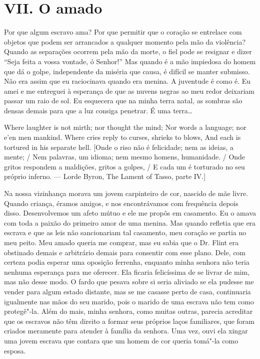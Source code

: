 \chapter{VII. O amado}

Por que algum escravo ama? Por que
permitir que o coração se entrelace com objetos que podem ser arrancados
a qualquer momento pela mão da violência? Quando as separações ocorrem
pela mão da morte, o fiel pode se resignar e dizer ``Seja feita a vossa
vontade, ó Senhor!'' Mas quando é a mão impiedosa do homem que dá o
golpe, independente da miséria que causa, é difícil se manter submisso.
Não era assim que eu raciocinava quando era menina. A juventude é como
é. Eu amei e me entreguei à esperança de que as nuvens negras ao meu
redor deixariam passar um raio de sol. Eu esquecera que na minha terra
natal, as sombras são densas demais para que a luz consiga penetrar. É
uma terra\ldots{}

Where laughter is not mirth; nor thought the mind; Nor words a language;
nor e'en men mankind. Where cries reply to curses, shrieks to blows, And
each is tortured in his separate hell. {[}Onde o riso não é felicidade;
nem as ideias, a mente; / Nem palavras, um idioma; nem mesmo homens,
humanidade. / Onde gritos respondem a maldições, gritos a golpes, / E
cada um é torturado no seu próprio inferno. --- Lorde Byron, The Lament
of Tasso, parte IV.{]}

Na nossa vizinhança morava um jovem
carpinteiro de cor, nascido de mãe livre. Quando criança, éramos amigos,
e nos encontrávamos com frequência depois disso. Desenvolvemos um afeto
mútuo e ele me propôs em casamento. Eu o amava com toda a paixão do
primeiro amor de uma menina. Mas quando refletia que era escrava e que
as leis não sancionariam tal casamento, meu coração se partia no meu
peito. Meu amado queria me comprar, mas eu sabia que o Dr. Flint era
obstinado demais e arbitrário demais para consentir com esse plano.
Dele, com certeza podia esperar uma oposição ferrenha, enquanto minha
senhora não teria nenhuma esperança para me oferecer. Ela ficaria
felicíssima de se livrar de mim, mas não desse modo. O fardo que pesava
sobre si seria aliviado se ela pudesse me vender para algum estado
distante, mas se me casasse perto de casa, continuaria igualmente nas
mãos do seu marido, pois o marido de uma escrava não tem como
protegê"-la. Além do mais, minha senhora, como muitas outras, parecia
acreditar que os escravos não têm direito a formar seus próprios laços
familiares, que foram criados meramente para atender à família da
senhora. Uma vez, ouvi ela xingar uma jovem escrava que contara que um
homem de cor queria tomá"-la como esposa.


